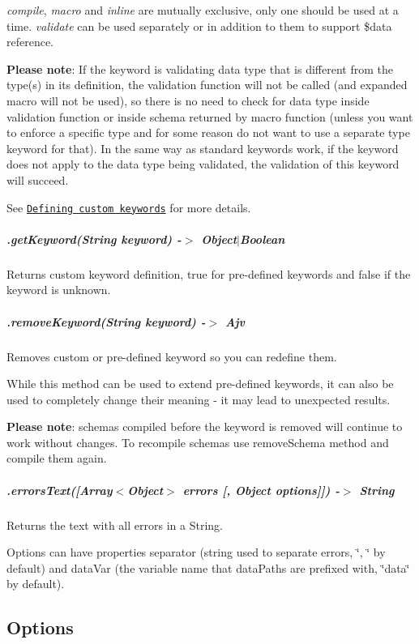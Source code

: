 {\itshape compile}, {\itshape macro} and {\itshape inline} are mutually exclusive, only one should be used at a time. {\itshape validate} can be used separately or in addition to them to support \$data reference.

{\bfseries Please note}\+: If the keyword is validating data type that is different from the type(s) in its definition, the validation function will not be called (and expanded macro will not be used), so there is no need to check for data type inside validation function or inside schema returned by macro function (unless you want to enforce a specific type and for some reason do not want to use a separate {\ttfamily type} keyword for that). In the same way as standard keywords work, if the keyword does not apply to the data type being validated, the validation of this keyword will succeed.

See \href{#defining-custom-keywords}{\tt Defining custom keywords} for more details.

\subparagraph*{.get\+Keyword(\+String keyword) -\/$>$ Object$\vert$\+Boolean}

Returns custom keyword definition, {\ttfamily true} for pre-\/defined keywords and {\ttfamily false} if the keyword is unknown.

\subparagraph*{.remove\+Keyword(\+String keyword) -\/$>$ Ajv}

Removes custom or pre-\/defined keyword so you can redefine them.

While this method can be used to extend pre-\/defined keywords, it can also be used to completely change their meaning -\/ it may lead to unexpected results.

{\bfseries Please note}\+: schemas compiled before the keyword is removed will continue to work without changes. To recompile schemas use {\ttfamily remove\+Schema} method and compile them again.

\subparagraph*{.errors\+Text(\mbox{[}Array$<$Object$>$ errors \mbox{[}, Object options\mbox{]}\mbox{]}) -\/$>$ String}

Returns the text with all errors in a String.

Options can have properties {\ttfamily separator} (string used to separate errors, \char`\"{}, \char`\"{} by default) and {\ttfamily data\+Var} (the variable name that data\+Paths are prefixed with, \char`\"{}data\char`\"{} by default).

\subsection*{Options}

